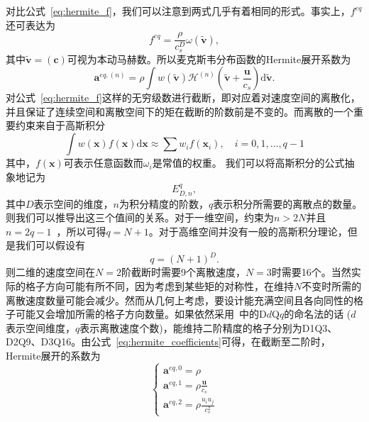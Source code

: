 对比公式~\ref{eq:hermite_f}，我们可以注意到两式几乎有着相同的形式。事实上，$f^{eq}$还可表达为
\begin{equation}
    f^{eq}=\frac{\rho}{c_s^D}\omega(\tilde{\boldsymbol{v}}),
\end{equation}
其中$\tilde{\boldsymbol{v}}=(\mathbf{c})$可视为本动马赫数。所以麦克斯韦分布函数的Hermite展开系数为
\begin{equation}
    \boldsymbol{a}^{eq,(n)}=\rho \int w(\tilde{\boldsymbol{v}}) \mathscr{H}^{(n)}\left(\tilde{\boldsymbol{v}}+\frac{\boldsymbol{u}}{c_s}\right) \mathrm{d} \tilde{\boldsymbol{v}}.
    \label{eq:hermite_coefficients}
\end{equation}
对公式~\ref{eq:hermite_f}这样的无穷级数进行截断，即对应着对速度空间的离散化，并且保证了连续空间和离散空间下的矩在截断的阶数前是不变的。而离散的一个重要约束来自于高斯积分
\begin{equation}
    \int w(\boldsymbol{x}) f(\boldsymbol{x}) \mathrm{d} \boldsymbol{x} \approx \sum w_i f(\boldsymbol{x}_i), \quad i=0,1, \ldots, q-1
\end{equation}
其中，$f(\boldsymbol{x})$可表示任意函数而$\omega_i$是常值的权重。
我们可以将高斯积分的公式抽象地记为
\begin{equation}
    E^q_{D,n},
\end{equation}
其中$D$表示空间的维度，$n$为积分精度的阶数，$q$表示积分所需要的离散点的数量。则我们可以推导出这三个值间的关系。对于一维空间，约束为$n>2N$并且$n=2q-1$~\cite{shan2006kinetic}，所以可得$q=N+1$。对于高维空间并没有一般的高斯积分理论，但是我们可以假设有
\begin{equation}
    q=(N+1)^D.
\end{equation}
则二维的速度空间在$N=2$阶截断时需要9个离散速度，$N=3$时需要16个。当然实际的格子方向可能有所不同，因为考虑到某些矩的对称性，在维持$N$不变时所需的离散速度数量可能会减少。然而从几何上考虑，要设计能充满空间且各向同性的格子可能又会增加所需的格子方向数量。如果依然采用~\cite{qian1992lattice}中的D$d$Q$q$的命名法的话 ($d$表示空间维度，$q$表示离散速度个数)，能维持二阶精度的格子分别为D1Q3、D2Q9、D3Q16。由公式~\ref{eq:hermite_coefficients}可得，在截断至二阶时，Hermite展开的系数为
\begin{equation}
    \left\{\begin{array}{l}\boldsymbol{a}^{eq, 0}=\rho \\ \boldsymbol{a}^{eq, 1}=\rho \frac{\boldsymbol{u}}{c_s} \\ \boldsymbol{a}^{eq, 2}=\rho \frac{u_i u_j}{c_s^2}\end{array}\right.
\end{equation}

